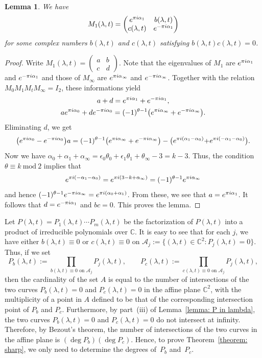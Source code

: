 \documentclass[11pt]{article}
\numberwithin{equation}{section}
\numberwithin{equation}{section}
\newtheorem{Lemma}[Theorem]{Lemma}
\def\C{\mathbb C}
\def\mod{\ \mathrm{mod}\ }
\def\M#1#2#3#4{\begin{pmatrix}#1&#2\\#3&#4\end{pmatrix}}
\def\SM#1#2#3#4{\left(\begin{smallmatrix}#1&#2\\#3&#4\end{smallmatrix}
 \right)}
\begin{document}
\begin{Lemma} We have
\[
M_1(\lambda,t)=\M{{\rm e}^{\pi {\rm i}\alpha_1}}{b(\lambda,t)}{c(\lambda,t)}
{{\rm e}^{-\pi {\rm i}\alpha_1}}
\]
for some complex numbers $b(\lambda,t)$ and $c(\lambda,t)$ satisfying
$b(\lambda,t)c(\lambda,t)=0$.
\end{Lemma}

\begin{proof} Write $M_1(\lambda,t)=\SM abcd$. Note that the
 eigenvalues of $M_1$ are ${\rm e}^{\pi {\rm i}\alpha_1}$ and ${\rm e}^{-\pi
 {\rm i}\alpha_1}$ and those of $M_\infty$ are ${\rm e}^{\pi {\rm i}\alpha_\infty}$
 and ${\rm e}^{-\pi {\rm i}\alpha_\infty}$. Together with the relation
 $M_0M_1M_tM_\infty=I_2$, these informations yield
 \begin{gather*}
 a+d={\rm e}^{\pi {\rm i}\alpha_1}+{\rm e}^{-\pi {\rm i}\alpha_1}, \\
 a{\rm e}^{\pi {\rm i}\alpha_0}+d{\rm e}^{-\pi {\rm i}\alpha_0}
 =(-1)^{\theta-1}\bigl({\rm e}^{\pi {\rm i}\alpha_\infty}+{\rm e}^{-\pi {\rm i}\alpha_\infty}\bigr).
 \end{gather*}
 Eliminating $d$, we get
\[
 \bigl({\rm e}^{\pi {\rm i}\alpha_0}-{\rm e}^{-\pi {\rm i}\alpha_0}\bigr)a
 =(-1)^{\theta-1}\bigl({\rm e}^{\pi {\rm i}\alpha_\infty}+{\rm e}^{-\pi {\rm i}\alpha_\infty}\bigr)
 -\bigl({\rm e}^{\pi {\rm i}(\alpha_1-\alpha_0)}{+{\rm e}^{\pi {\rm i}(-\alpha_1-\alpha_0)}}\bigr).
\]
 Now we have $\alpha_0+\alpha_1+\alpha_\infty=\epsilon_0\theta_0
 +\epsilon_1\theta_1+\theta_\infty-3=k-3$. Thus, the condition
 $\theta\equiv k\mod 2$ implies that
\[
 {\rm e}^{\pi {\rm i}(-\alpha_1-\alpha_0)}={\rm e}^{\pi {\rm i}(3-k+\alpha_\infty)}
 =(-1)^{\theta-1}{\rm e}^{\pi {\rm i}\alpha_\infty}
\]
 and hence $(-1)^{\theta-1}{\rm e}^{-\pi {\rm i}\alpha_\infty}
 ={\rm e}^{\pi {\rm i}(\alpha_0+\alpha_1)}$.
 From these, we see that $a={\rm e}^{\pi {\rm i}\alpha_1}$. It follows that
 $d={\rm e}^{-\pi {\rm i}\alpha_1}$ and $bc=0$. This proves the lemma.
\end{proof}

Let $P(\lambda,t)=P_1(\lambda,t)\cdots P_m(\lambda,t)$ be
the factorization of $P(\lambda,t)$ into a product of irreducible
polynomials over $\C$. It is easy to see that for each $j$, we have
either $b(\lambda,t)\equiv 0$ or $c(\lambda,t)\equiv 0$ on $\mathcal
A_j:=\bigl\{(\lambda,t)\in\C^2\colon P_j(\lambda,t)=0\bigr\}$. Thus, if we set
\[
 P_b(\lambda,t):=\prod_{b(\lambda,t)\equiv 0\text{ on }\mathcal A_j}
 P_j(\lambda,t), \qquad
 P_c(\lambda,t):=\prod_{c(\lambda,t)\equiv 0\text{ on }\mathcal A_j}
 P_j(\lambda,t),
\]
then the cardinality of the set $A$ is equal to the number of
intersections of the two curves $P_b(\lambda,t)=0$ and
$P_c(\lambda,t)=0$ in the affine plane $\C^2$, with the multiplicity
of a point in $A$ defined to be that of the corresponding intersection
point of $P_b$ and $P_c$. Furthermore, by part~(iii) of Lemma~\ref{lemma: P in lambda}, the two curves $P_b(\lambda,t)=0$ and
$P_c(\lambda,t)=0$ do not intersect at infinity. Therefore, by
Bezout's theorem, the number of intersections of the two curves in the
affine plane is $(\deg P_b)(\deg P_c)$. Hence, to prove Theorem~\ref{theorem: sharp}, we only need to determine the degrees of~$P_b$
and~$P_c$.
\end{document}
